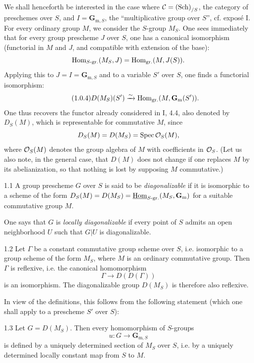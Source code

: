 We shall henceforth be interested in the case where $\mathcal C=\textup{(Sch)}_{/S}$, the category of preschemes over $S$, and $I=\mathbf{G}_{\mathrm{m},S}$, the ``multiplicative group over $S$'', cf. expos\'e I. For every ordinary group $M$, we consider the $S$-group $M_S$. One sees immediately that for every group prescheme $J$ over $S$, one has a canonical isomorphism (functorial in $M$ and $J$, and compatible with extension of the base):
\[
\operatorname{Hom}_{S\text{-}\mathrm{gr.}}(M_S,J)=\operatorname{Hom}_{\mathrm{gr.}}(M,J(S)).
\]
Applying this to $J=I=\mathbf{G}_{\mathrm{m},S}$ and to a variable $S'$ over $S$, one finds a functorial isomorphism:
\begin{equation}\tag{1.0.4}
D(M_S)(S')\xrightarrow{\sim}\operatorname{Hom}_{\mathrm{gr.}}(M,\mathbf{G}_{\mathrm{m}}(S')).
\end{equation}
One thus recovers the functor already considered in I, 4.4, also denoted by $D_S(M)$, which is representable for commutative $M$, since
\[
D_S(M)=D(M_S)=\operatorname{Spec}\mathcal{O}_S(M),
\]
where $\mathcal{O}_S(M)$ denotes the group algebra of $M$ with coefficients in $\mathcal{O}_S$. (Let us also note, in the general case, that $D(M)$ does not change if one replaces $M$ by its abelianization, so that nothing is lost by supposing $M$ commutative.)
\begin{definition}{1.1}\label{VIII.1.1}
A group prescheme $G$ over $S$ is said to be \emph{diagonalizable} if it is isomorphic to a scheme of the form $D_S(M)=D(M_S)=\underline{\operatorname{Hom}}_{S\text{-}\mathrm{gr.}}(M_S,\mathbf{G}_{\mathrm{m}})$ for a suitable commutative group $M$.

One says that $G$ is \emph{locally diagonalizable} if every point of $S$ admits an open neighborhood $U$ such that $G|U$ is diagonalizable.
\end{definition}
\begin{theorem}{1.2}\label{VIII.1.2}
Let $\Gamma$ be a constant commutative group scheme over $S$, i.e. isomorphic to a group scheme of the form $M_S$, where $M$ is an ordinary commutative group. Then $\Gamma$ is reflexive, i.e. the canonical homomorphism
\[
\Gamma\to D(D(\Gamma))
\]
is an isomorphism. The diagonalizable group $D(M_S)$ is therefore also reflexive.
\end{theorem}
In view of the definitions, this follows from the following statement (which one shall apply to a prescheme $S'$ over $S$):
\begin{corollary}{1.3}\label{VIII.1.3}
Let $G=D(M_S)$. Then every homomorphism of $S$-groups
\[
u:G\to\mathbf{G}_{\mathrm{m},S}
\]
is defined by a uniquely determined section of $M_S$ over $S$, i.e. by a uniquely determined locally constant map from $S$ to $M$.
\end{corollary}
